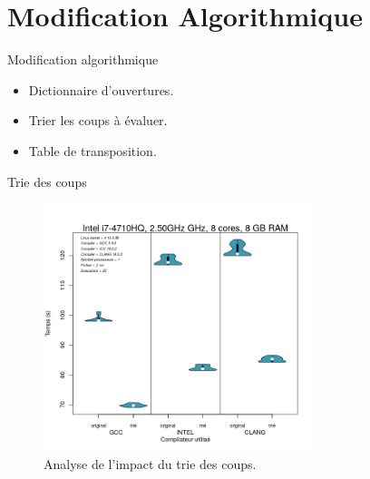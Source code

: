 \documentclass{beamer}
\begin{document}
\section{Modification Algorithmique}


\begin{frame}{Modification algorithmique}

\begin{itemize}
  \item
    Dictionnaire d'ouvertures.
  \item
    Trier les coups à évaluer.
  \item
    Table de transposition.
 \end{itemize}	
\end{frame}

\begin{frame}{Trie des coups}
	\begin{figure}
      \includegraphics[width=0.7\textwidth]{trie.png}
      \caption{Analyse de l'impact du trie des coups.\label{Fig:trie}}
	\end{figure}
\end{frame}
\end{document}
